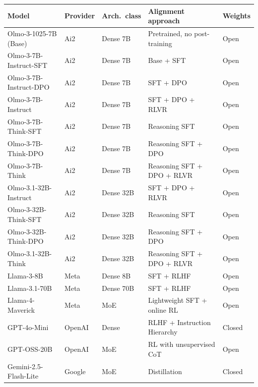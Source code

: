 \documentclass{article}
\begin{document}
\begin{table}[H]
    \centering
    \footnotesize
    \setlength{\tabcolsep}{4pt}
    \renewcommand{\arraystretch}{1.0}
    \begin{tabular}{l l l l l}
        \toprule
        Model & Provider & Arch.\ class & Alignment approach & Weights \\
        \midrule
        Olmo-3-1025-7B (Base) & Ai2 & Dense 7B & Pretrained, no post-training \citep{olmo3} & Open \\
        Olmo-3-7B-Instruct-SFT & Ai2 & Dense 7B & Base + SFT \citep{olmo3} & Open \\
        Olmo-3-7B-Instruct-DPO & Ai2 & Dense 7B & SFT + DPO \citep{olmo3} & Open \\
        Olmo-3-7B-Instruct & Ai2 & Dense 7B & SFT + DPO + RLVR \citep{olmo3} & Open \\
        Olmo-3-7B-Think-SFT & Ai2 & Dense 7B & Reasoning SFT \citep{olmo3} & Open \\
        Olmo-3-7B-Think-DPO & Ai2 & Dense 7B & Reasoning SFT + DPO \citep{olmo3} & Open \\
        Olmo-3-7B-Think & Ai2 & Dense 7B & Reasoning SFT + DPO + RLVR \citep{olmo3} & Open \\
        Olmo-3.1-32B-Instruct & Ai2 & Dense 32B & SFT + DPO + RLVR \citep{olmo3} & Open \\
        Olmo-3-32B-Think-SFT & Ai2 & Dense 32B & Reasoning SFT \citep{olmo3} & Open \\
        Olmo-3-32B-Think-DPO & Ai2 & Dense 32B & Reasoning SFT + DPO \citep{olmo3} & Open \\
        Olmo-3.1-32B-Think & Ai2 & Dense 32B & Reasoning SFT + DPO + RLVR \citep{olmo3} & Open \\
        Llama-3-8B & Meta & Dense 8B & SFT + RLHF \citep{meta2024llama3} & Open \\
        Llama-3.1-70B & Meta & Dense 70B & SFT + RLHF \citep{meta2024llama3} & Open \\
        Llama-4-Maverick & Meta & MoE & Lightweight SFT + online RL \citep{meta2025llama4} & Open \\
        GPT-4o-Mini & OpenAI & Dense & RLHF + Instruction Hierarchy \citep{openai2024gpt4omini} & Closed \\
        GPT-OSS-20B & OpenAI & MoE & RL with unsupervised CoT \citep{openai2025gptoss} & Open \\
        Gemini-2.5-Flash-Lite & Google & MoE & Distillation \citep{google2025gemini25} & Closed \\

\end{tabular}
\end{table}
\end{document}
